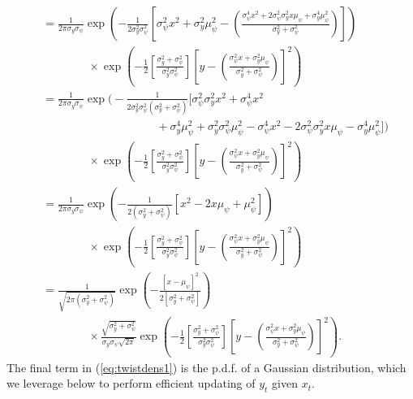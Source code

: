 \documentclass[a4paper]{article}
\begin{document}
\begin{align}
     &= \frac{1}{2\pi\sigma_y\sigma_{\psi}} \exp\left(-\frac{1}{2\sigma^2_y \sigma^2_{\psi}}\left[\sigma^2_{\psi}x^2 + \sigma^2_y\mu^2_{\psi} - \left(\frac{\sigma^4_{\psi}x^2 + 2\sigma^2_{\psi}\sigma^2_yx\mu_{\psi} + \sigma^4_y\mu^2_{\psi}}{\sigma^2_y + \sigma^2_{\psi}}\right)\right]\right)\nonumber\\
     & \qquad \qquad \times \exp\left(-\frac{1}{2}\left[\frac{\sigma^2_y + \sigma^2_{\psi}}{\sigma^2_y\sigma^2_{\psi}}\right]\left[y - \left(\frac{\sigma^2_{\psi}x + \sigma^2_y\mu_{\psi}}{\sigma^2_y + \sigma^2_{\psi}}\right)\right]^2\right)\nonumber\\
     &= \frac{1}{2\pi\sigma_y\sigma_{\psi}} \exp\Bigg(-\frac{1}{2\sigma^2_y \sigma^2_{\psi}\left(\sigma^2_y + \sigma^2_{\psi}\right)}\Bigg[\sigma^2_{\psi}\sigma^2_y x^2 + \sigma^4_{\psi}x^2 \nonumber\\
     & \qquad \qquad \qquad \qquad \qquad + \sigma^4_y\mu^2_{\psi} + \sigma^2_y\sigma^2_{\psi} \mu^2_{\psi} - \sigma^4_{\psi}x^2 - 2\sigma^2_{\psi}\sigma^2_yx\mu_{\psi} - \sigma^4_y\mu^2_{\psi}\Bigg]\Bigg)\nonumber\\
     & \qquad \qquad \times \exp\left(-\frac{1}{2}\left[\frac{\sigma^2_y + \sigma^2_{\psi}}{\sigma^2_y\sigma^2_{\psi}}\right]\left[y - \left(\frac{\sigma^2_{\psi}x + \sigma^2_y\mu_{\psi}}{\sigma^2_y + \sigma^2_{\psi}}\right)\right]^2\right)\nonumber\\
     &= \frac{1}{2\pi\sigma_y\sigma_{\psi}} \exp\left(-\frac{1}{2\left(\sigma^2_y + \sigma^2_{\psi}\right)}\left[x^2 - 2x\mu_{\psi} + \mu^2_{\psi} \right]\right)\nonumber\\
     & \qquad \qquad \times \exp\left(-\frac{1}{2}\left[\frac{\sigma^2_y + \sigma^2_{\psi}}{\sigma^2_y\sigma^2_{\psi}}\right]\left[y - \left(\frac{\sigma^2_{\psi}x + \sigma^2_y\mu_{\psi}}{\sigma^2_y + \sigma^2_{\psi}}\right)\right]^2\right)\nonumber\\
     &= \frac{1}{\sqrt{2\pi\left(\sigma^2_y + \sigma^2_{\psi}\right)}} \exp\left(-\frac{\left[x - \mu_{\psi}\right]^2}{2\left[\sigma^2_y + \sigma^2_{\psi}\right]}\right) \nonumber\\
     & \qquad \qquad \times \frac{\sqrt{\sigma^2_y + \sigma^2_{\psi}}}{\sigma_y\sigma_{\psi}\sqrt{2\pi}} \exp\left(-\frac{1}{2}\left[\frac{\sigma^2_y + \sigma^2_{\psi}}{\sigma^2_y\sigma^2_{\psi}}\right]\left[y - \left(\frac{\sigma^2_{\psi}x + \sigma^2_y\mu_{\psi}}{\sigma^2_y + \sigma^2_{\psi}}\right)\right]^2\right).\label{eq:twistdens1}
\end{align}
The final term in (\ref{eq:twistdens1}) is the p.d.f. of a Gaussian distribution, which we leverage below to perform efficient updating of $y_t$ given $x_t$. 
\end{document}

